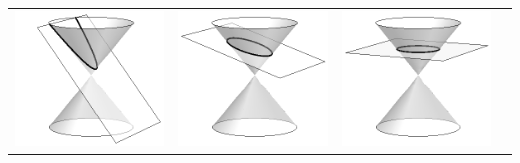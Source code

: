 \noindent\begin{minipage}{\textwidth+50pt}
\noindent\centering
\begin{tabular}{cccc}
\includegraphics[scale=.25]{figures/conic_parabola}&
\includegraphics[scale=.25]{figures/conic_ellipse}&
\includegraphics[scale=.25]{figures/conic_circle}&

\end{tabular}
\end{minipage}

